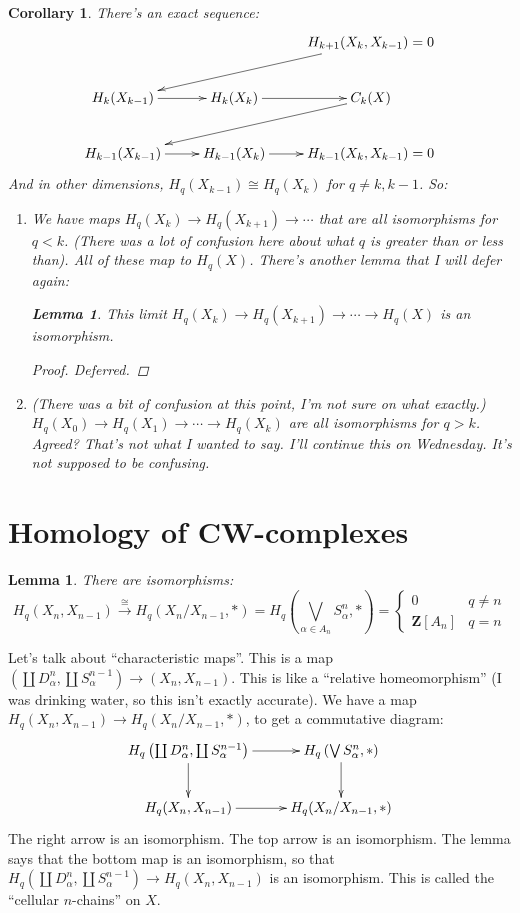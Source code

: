 \documentclass{amsart}
\theoremstyle{theorem}
\newtheorem{lemma}[theorem]{Lemma}
\newtheorem{corollary}[theorem]{Corollary}
\theoremstyle{definition}
\newcommand{\Z}{\mathbf Z}
\begin{document}
\begin{corollary}
There's an exact sequence:
\begin{equation*}
\xymatrix{ & & H_{k+1}(X_k,X_{k-1})=0\ar[dll]\\
 H_k(X_{k-1})\ar[r] & H_k(X_k)\ar[r] & C_k(X)\ar[dll]\\
 H_{k-1}(X_{k-1})\ar[r] & H_{k-1}(X_k)\ar[r] & H_{k-1}(X_k,X_{k-1})=0}
\end{equation*}
And in other dimensions, $ H_q(X_{k-1})\cong H_q(X_k)$ for $q\neq k,k-1$. So:
\begin{enumerate}
\item We have maps $ H_q(X_k)\to H_q(X_{k+1})\to\cdots$ that are all isomorphisms for $q<k$. (There was a lot of confusion here about what $q$ is greater than or less than). All of these map to $ H_q(X)$. There's another lemma that I will defer again:
	\begin{lemma}
	This limit $ H_q(X_k)\to H_q(X_{k+1})\to\cdots\to H_q(X)$ is an isomorphism.
	\end{lemma}
	\begin{proof}
	Deferred.
	\end{proof}
\item (There was a bit of confusion at this point, I'm not sure on what exactly.) $ H_q(X_0)\to H_q(X_1)\to\cdots\to H_q(X_k)$ are all isomorphisms for $q>k$. Agreed? That's not what I wanted to say. I'll continue this on Wednesday. It's not supposed to be confusing.
\end{enumerate}
\end{corollary}
\section{Homology of CW-complexes}
\begin{lemma}
There are isomorphisms:
\begin{equation*}
 H_q(X_n,X_{n-1})\xrightarrow{\cong} H_q(X_n/X_{n-1},\ast)= H_q\left(\bigvee_{\alpha\in A_n}S^n_\alpha,\ast\right)=\begin{cases}0 & q\neq n \\ \Z[A_n] & q=n\end{cases}
\end{equation*}
\end{lemma}
Let's talk about ``characteristic maps''. This is a map $\left(\coprod D^n_\alpha,\coprod S^{n-1}_\alpha\right)\to (X_n,X_{n-1})$. This is like a ``relative homeomorphism'' (I was drinking water, so this isn't exactly accurate). We have a map $ H_q(X_n,X_{n-1})\to H_q(X_n/X_{n-1},\ast)$, to get a commutative diagram:
\begin{equation*}
\xymatrix{ H_q\left(\coprod D^n_\alpha,\coprod S^{n-1}_\alpha\right)\ar[r]\ar[d] & H_q\left(\bigvee S^n_\alpha,\ast\right)\ar[d]\\
 H_q(X_n,X_{n-1})\ar[r] & H_q(X_n/X_{n-1},\ast)}
\end{equation*}
The right arrow is an isomorphism. The top arrow is an isomorphism. The lemma says that the bottom map is an isomorphism, so that $ H_q\left(\coprod D^n_\alpha,\coprod S^{n-1}_\alpha\right)\to H_q(X_n,X_{n-1})$ is an isomorphism. This is called the ``cellular $n$-chains'' on $X$.
\end{document}
